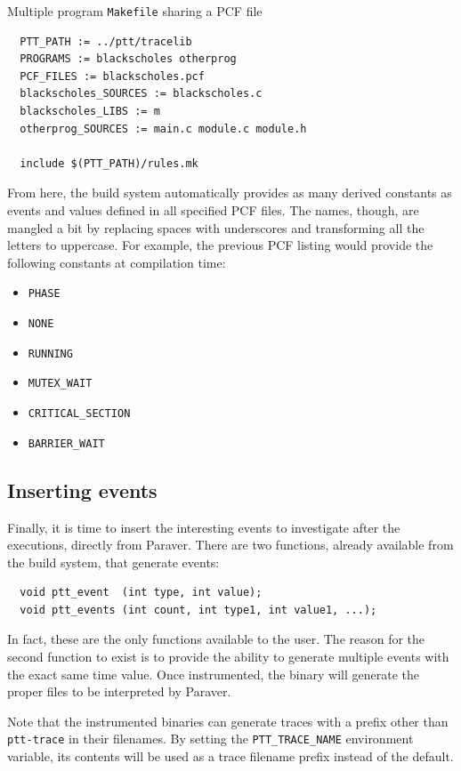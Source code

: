 \begin{listing}
\label{code:makefile4}
\caption{Multiple program \texttt{Makefile} sharing a PCF file}
\begin{verbatim}
  PTT_PATH := ../ptt/tracelib
  PROGRAMS := blackscholes otherprog
  PCF_FILES := blackscholes.pcf
  blackscholes_SOURCES := blackscholes.c
  blackscholes_LIBS := m
  otherprog_SOURCES := main.c module.c module.h

  include $(PTT_PATH)/rules.mk
\end{verbatim}
\end{listing}

From here, the build system automatically provides as many derived constants as
events and values defined in all specified PCF files.  The names, though, are
mangled a bit by replacing spaces with underscores and transforming all the
letters to uppercase.  For example, the previous PCF listing would provide the
following constants at compilation time:

\begin{itemize}
\item \verb:PHASE:
\item \verb:NONE:
\item \verb:RUNNING:
\item \verb:MUTEX_WAIT:
\item \verb:CRITICAL_SECTION:
\item \verb:BARRIER_WAIT:
\end{itemize}


\subsection{Inserting events}

Finally, it is time to insert the interesting events to investigate after the
executions, directly from Paraver.  There are two functions, already available
from the build system, that generate events:

\begin{verbatim}
  void ptt_event  (int type, int value);
  void ptt_events (int count, int type1, int value1, ...);
\end{verbatim}

In fact, these are the only functions available to the user.  The reason for the
second function to exist is to provide the ability to generate multiple events
with the exact same time value.  Once instrumented, the binary will generate the
proper files to be interpreted by Paraver.

Note that the instrumented binaries can generate traces with a prefix other than
\verb:ptt-trace: in their filenames.  By setting the \verb:PTT_TRACE_NAME:
environment variable, its contents will be used as a trace filename prefix
instead of the default.

